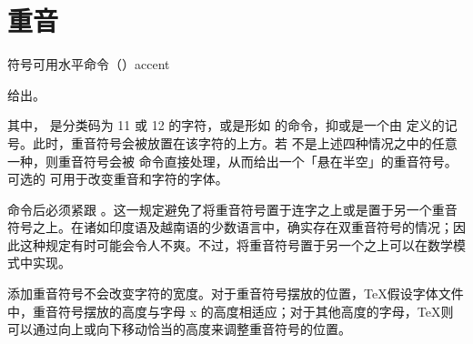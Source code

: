 \documentclass{book}
\begin{document}
\section{重音}

符号可用水平命令（）\csterm accent\par 给出。\label{character}
\begin{disp}
\end{disp}
其中， 是分类码为 11 或 12 的字符，或是形如  的命令，抑或是一个由  定义的记号。此时，重音符号会被放置在该字符的上方。若  不是上述四种情况之中的任意一种，则重音符号会被  命令直接处理，从而给出一个「悬在半空」的重音符号。可选的  可用于改变重音和字符的字体。

 命令后必须紧跟 。这一规定避免了将重音符号置于连字之上或是置于另一个重音符号之上。在诸如印度语及越南语的少数语言中，确实存在双重音符号的情况；因此这种规定有时可能会令人不爽。不过，将重音符号置于另一个之上可以在数学模式中实现。

添加重音符号不会改变字符的宽度。对于重音符号摆放的位置，\TeX 假设字体文件中，重音符号摆放的高度与字母 x 的高度相适应；对于其他高度的字母，\TeX 则可以通过向上或向下移动恰当的高度来调整重音符号的位置。
\end{document}
